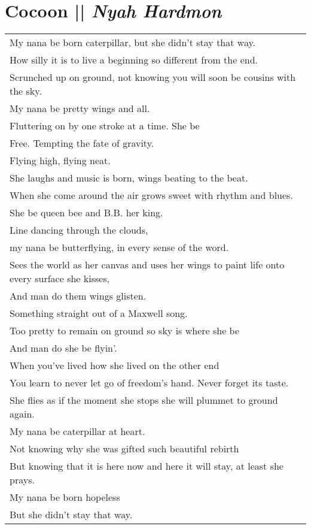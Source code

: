 \section[Cocoon]{Cocoon || \emph{Nyah Hardmon} \hspace*{\fill}  \thepage}
\vspace*{0.3cm}
\begin{center}
\begin{tabular}{l}
My nana be born caterpillar, but she didn’t stay that way.\\
How silly it is to live a beginning so different from the end.\\
Scrunched up on ground, not knowing you will soon be cousins with the sky.\\
My nana be pretty wings and all.\\
Fluttering on by one stroke at a time. She be\\
Free. Tempting the fate of gravity.\\
Flying high, flying neat.\\
She laughs and music is born, wings beating to the beat.\\
When she come around the air grows sweet with rhythm and blues.\\
She be queen bee and B.B. her king.\\
Line dancing through the clouds,\\
my nana be butterflying, in every sense of the word.\\
Sees the world as her canvas and uses her wings to paint life onto every surface she kisses,\\
And man do them wings glisten.\\
Something straight out of a Maxwell song.\\
Too pretty to remain on ground so sky is where she be\\
And man do she be flyin’.\\
When you’ve lived how she lived on the other end\\
You learn to never let go of freedom’s hand. Never forget its taste.\\
She flies as if the moment she stops she will plummet to ground again.\\
My nana be caterpillar at heart.\\
Not knowing why she was gifted such beautiful rebirth\\
But knowing that it is here now and here it will stay, at least she prays.\\
My nana be born hopeless\\
But she didn’t stay that way.
\end{tabular}
\end{center}